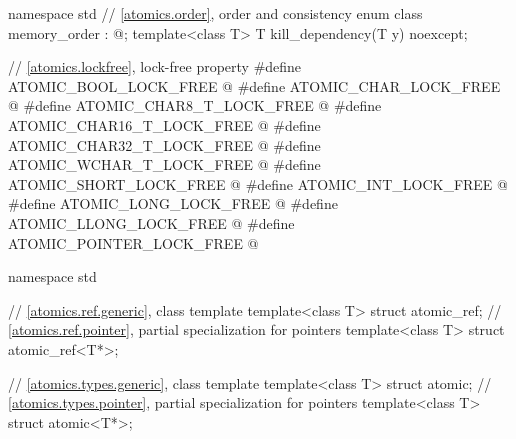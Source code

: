 %
\begin{codeblock}
namespace std {
  // \ref{atomics.order}, order and consistency
  enum class memory_order : @\unspec@;
  template<class T>
    T kill_dependency(T y) noexcept;
}

// \ref{atomics.lockfree}, lock-free property
#define ATOMIC_BOOL_LOCK_FREE @\unspec@
#define ATOMIC_CHAR_LOCK_FREE @\unspec@
#define ATOMIC_CHAR8_T_LOCK_FREE @\unspec@
#define ATOMIC_CHAR16_T_LOCK_FREE @\unspec@
#define ATOMIC_CHAR32_T_LOCK_FREE @\unspec@
#define ATOMIC_WCHAR_T_LOCK_FREE @\unspec@
#define ATOMIC_SHORT_LOCK_FREE @\unspec@
#define ATOMIC_INT_LOCK_FREE @\unspec@
#define ATOMIC_LONG_LOCK_FREE @\unspec@
#define ATOMIC_LLONG_LOCK_FREE @\unspec@
#define ATOMIC_POINTER_LOCK_FREE @\unspec@

namespace std {
  // \ref{atomics.ref.generic}, class template 
  template<class T> struct atomic_ref;
  // \ref{atomics.ref.pointer}, partial specialization for pointers
  template<class T> struct atomic_ref<T*>;

  // \ref{atomics.types.generic}, class template 
  template<class T> struct atomic;
  // \ref{atomics.types.pointer}, partial specialization for pointers
  template<class T> struct atomic<T*>;

}
\end{codeblock}
